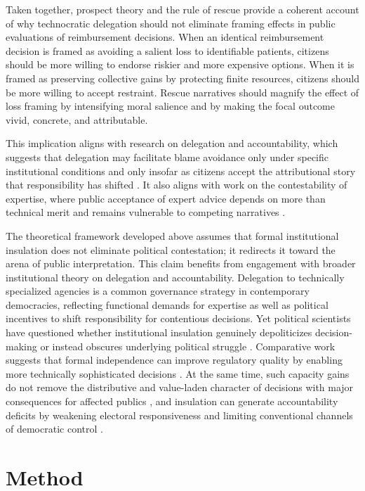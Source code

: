 \documentclass[11pt]{article}\usepackage[]{graphicx}\usepackage[]{xcolor}
\begin{document}
Taken together, prospect theory and the rule of rescue provide a coherent account of why technocratic delegation should not eliminate framing effects in public evaluations of reimbursement decisions. When an identical reimbursement decision is framed as avoiding a salient loss to identifiable patients, citizens should be more willing to endorse riskier and more expensive options. When it is framed as preserving collective gains by protecting finite resources, citizens should be more willing to accept restraint. Rescue narratives should magnify the effect of loss framing by intensifying moral salience and by making the focal outcome vivid, concrete, and attributable.

This implication aligns with research on delegation and accountability, which suggests that delegation may facilitate blame avoidance only under specific institutional conditions and only insofar as citizens accept the attributional story that responsibility has shifted \parencite{Heinkelmann-Wild2023,Heinkelmann-Wild2020}. It also aligns with work on the contestability of expertise, where public acceptance of expert advice depends on more than technical merit and remains vulnerable to competing narratives \parencite{Head2024}. 

The theoretical framework developed above assumes that formal institutional insulation does not eliminate political contestation; it redirects it toward the arena of public interpretation. This claim benefits from engagement with broader institutional theory on delegation and accountability. Delegation to technically specialized agencies is a common governance strategy in contemporary democracies, reflecting functional demands for expertise as well as political incentives to shift responsibility for contentious decisions. Yet political scientists have questioned whether institutional insulation genuinely depoliticizes decision-making or instead obscures underlying political struggle \parencite{Hanretty2018}. Comparative work suggests that formal independence can improve regulatory quality by enabling more technically sophisticated decisions \parencite{Hanretty2018}. At the same time, such capacity gains do not remove the distributive and value-laden character of decisions with major consequences for affected publics \parencite{Langvatn2022}, and insulation can generate accountability deficits by weakening electoral responsiveness and limiting conventional channels of democratic control \parencite{Crum2017}. 


\section{Method}\label{empirics}
\end{document}
